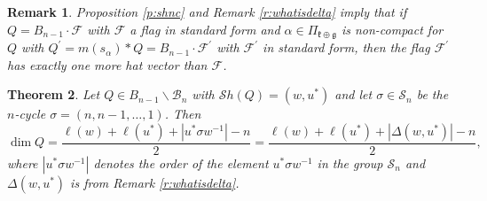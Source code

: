 \documentclass[12pt]{amsart}
\numberwithin{equation}{section}
\newtheorem{thm}{Theorem}[section]
\newtheorem{rem}[thm]{Remark}
\newcommand{\fk}{\mbox{${\mathfrak k}$}}
\newcommand{\fg}{\mbox{${\mathfrak g}$}}
\newcommand{\B}{\mathcal{B}}
\newcommand{\ms}{m(s_{\alpha})}
\newcommand{\F}{\mathcal{F}}
\newcommand{\Borbitspace}{B_{n-1}\backslash\B_{n}}
\newcommand{\Sh}{\mathcal{S}h}
\begin{document}
\begin{rem}\label{r:hatvectors}
Proposition \ref{p:shnc} and Remark \ref{r:whatisdelta} imply that if
$Q=B_{n-1}\cdot\F$ with $\F$ a flag in standard form and $\alpha\in\Pi_{\fk\oplus \fg}$ is non-compact   
for $Q$ with $Q^{\prime}=\ms*Q=B_{n-1}\cdot\F^{\prime}$ with $\F^{\prime}$ in standard form, then the 
flag $\F^{\prime}$ has exactly one more hat vector than $\F$. 

\end{rem}


\begin{thm}\label{t:dimformula}
Let $Q\in\Borbitspace$ with $\Sh(Q)=(w, u^{*})$ and let $\sigma\in\mathcal{S}_{n}$ be the $n$-cycle 
$\sigma=(n,n-1, \dots, 1)$.  Then 
\begin{equation}\label{eq:dimformula}
\dim Q=\frac{\ell(w)+\ell(u^{*})+|u^{*}\sigma w^{-1}|-n}{2} =\frac{\ell(w)+\ell(u^*)+|\Delta(w,u^*)|-n}{2},
\end{equation}
where $|u^{*}\sigma w^{-1}|$ denotes the order of the element $u^{*}\sigma w^{-1}$ in the group $\mathcal{S}_{n}$ and $\Delta(w,u^*)$ is from Remark \ref{r:whatisdelta}.
\end{thm}
\end{document}
